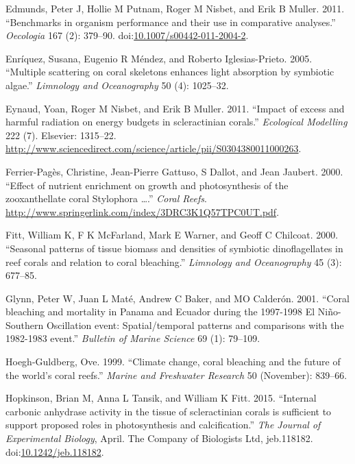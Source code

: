 \documentclass[]{elsarticle} %
\begin{document}
\hypertarget{ref-Edmunds:2011bv}{}
Edmunds, Peter J, Hollie M Putnam, Roger M Nisbet, and Erik B Muller.
2011. ``Benchmarks in organism performance and their use in comparative
analyses.'' \emph{Oecologia} 167 (2): 379--90.
doi:\href{https://doi.org/10.1007/s00442-011-2004-2}{10.1007/s00442-011-2004-2}.

\hypertarget{ref-Enriquez:2005p142}{}
Enríquez, Susana, Eugenio R Méndez, and Roberto Iglesias-Prieto. 2005.
``Multiple scattering on coral skeletons enhances light absorption by
symbiotic algae.'' \emph{Limnology and Oceanography} 50 (4): 1025--32.

\hypertarget{ref-Eynaud:2011tv}{}
Eynaud, Yoan, Roger M Nisbet, and Erik B Muller. 2011. ``Impact of
excess and harmful radiation on energy budgets in scleractinian
corals.'' \emph{Ecological Modelling} 222 (7). Elsevier: 1315--22.
\url{http://www.sciencedirect.com/science/article/pii/S0304380011000263}.

\hypertarget{ref-FerrierPages:2000p1950}{}
Ferrier-Pagès, Christine, Jean-Pierre Gattuso, S Dallot, and Jean
Jaubert. 2000. ``Effect of nutrient enrichment on growth and
photosynthesis of the zooxanthellate coral Stylophora \ldots{}.''
\emph{Coral Reefs}.
\url{http://www.springerlink.com/index/3DRC3K1Q57TPC0UT.pdf}.

\hypertarget{ref-Fitt:2000p3792}{}
Fitt, William K, F K McFarland, Mark E Warner, and Geoff C Chilcoat.
2000. ``Seasonal patterns of tissue biomass and densities of symbiotic
dinoflagellates in reef corals and relation to coral bleaching.''
\emph{Limnology and Oceanography} 45 (3): 677--85.

\hypertarget{ref-Glynn:2001p7571}{}
Glynn, Peter W, Juan L Maté, Andrew C Baker, and MO Calderón. 2001.
``Coral bleaching and mortality in Panama and Ecuador during the
1997-1998 El Niño-Southern Oscillation event: Spatial/temporal patterns
and comparisons with the 1982-1983 event.'' \emph{Bulletin of Marine
Science} 69 (1): 79--109.

\hypertarget{ref-HoeghGuldberg:1999p4222}{}
Hoegh-Guldberg, Ove. 1999. ``Climate change, coral bleaching and the
future of the world's coral reefs.'' \emph{Marine and Freshwater
Research} 50 (November): 839--66.

\hypertarget{ref-Hopkinson:2015ev}{}
Hopkinson, Brian M, Anna L Tansik, and William K Fitt. 2015. ``Internal
carbonic anhydrase activity in the tissue of scleractinian corals is
sufficient to support proposed roles in photosynthesis and
calcification.'' \emph{The Journal of Experimental Biology}, April. The
Company of Biologists Ltd, jeb.118182.
doi:\href{https://doi.org/10.1242/jeb.118182}{10.1242/jeb.118182}.
\end{document}
